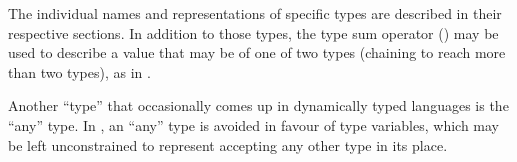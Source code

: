 The individual names and representations of specific types are described
in their respective sections. In addition to those types, the type sum operator
(\op{|}) may be used to describe a value that may be of one of two types (chaining
to reach more than two types), as in .

Another ``type'' that occasionally comes up in dynamically typed languages is the
``any'' type. In \Trilogy{}, an ``any'' type is avoided in favour of type variables,
which may be left unconstrained to represent accepting any other type in its place.






